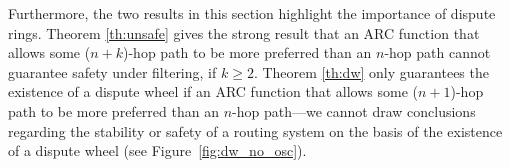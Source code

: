 Furthermore, the two results in this section highlight the importance of
dispute rings.  Theorem \ref{th:unsafe} gives the
strong result that an ARC function that allows some ($n+k$)-hop path to be
more preferred than an $n$-hop path cannot guarantee safety under
filtering, if $k \geq 2$.  Theorem \ref{th:dw} only
guarantees the existence of a dispute wheel if an ARC function that allows some
($n+1$)-hop path to be more preferred than an $n$-hop path---we
cannot draw conclusions regarding the stability or safety of a routing
system on the basis of the existence of a dispute wheel (see
Figure~\ref{fig:dw_no_osc}).  





